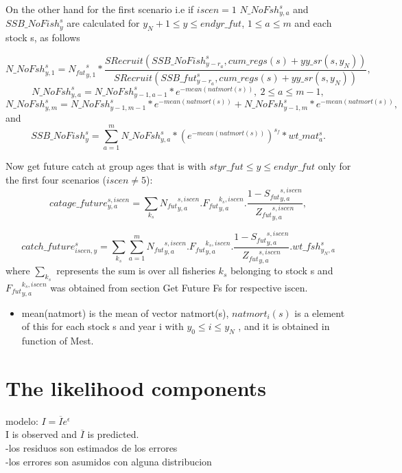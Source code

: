 \documentclass{article}
\begin{document}
On the other hand for the first scenario i.e if $iscen=1$ $N\_NoFsh^s_{y,a}$ and $SSB\_NoFish^s_y$ are calculated for $y_N+1\leq y \leq endyr\_fut$, $1\leq a \leq m$ and each stock s, as follows

\begin{equation}
    N\_NoFsh^{s}_{y,1}={N_{fut}}^s_{y,1}*\dfrac{SRecruit(SSB\_NoFish^s_{y-r_a},cum\_regs(s)+yy\_sr(s,y_N))}{ SRecruit(SSB\_fut^s_{y-r_a},cum\_regs(s)+yy\_sr(s,y_N))},
\end{equation}
\begin{equation}
    N\_NoFsh^{s}_{y,a}=N\_NoFsh^s_{y-1,a-1}*e^{-mean(natmort(s))}, \ 2\leq a\leq m-1,
\end{equation}
\begin{equation}
    N\_NoFsh^s_{y,m}=N\_NoFsh^s_{y-1,m-1}*e^{-mean(natmort(s))}+N\_NoFsh^s_{y-1,m}*e^{-mean(natmort(s))},
\end{equation}
and
\begin{equation}
    SSB\_NoFish^s_y   = \sum_{a=1}^mN\_NoFsh^s_{y,a}*(e^{-mean(natmort(s))})^{s_f} * wt\_{mat}^s_a.
\end{equation}

Now get future catch at group ages that is with $styr\_fut \leq y \leq endyr\_fut$ only for the first four scenarios ($iscen\neq 5$):
\begin{equation}
    catage\_future^{s,iscen}_{y,a}=\sum_{k_s} {N_{fut}}^{s,iscen}_{y,a}.{F_{fut}}^{k_s, iscen}_{y,a}.\dfrac{1-{S_{fut}}^{s,iscen}_{y,a}}{{Z_{fut}}^{s,iscen}_{y,a}},
\end{equation}

\begin{equation}
    catch\_future^s_{iscen,y}=\sum_{k_s} \sum_{a=1}^m{N_{fut}}^{s,iscen}_{y,a}.{F_{fut}}^{k_s, iscen}_{y,a}.\dfrac{1-{S_{fut}}^{s,iscen}_{y,a}}{{Z_{fut}}^{s,iscen}_{y,a}}.wt\_fsh^s_{y_N,a}
\end{equation}
where $\displaystyle\sum_{k_s}$ represents the sum is over all fisheries $k_s$ belonging to stock s and ${F_{fut}}^{k_s, iscen}_{y,a}$ was obtained from section Get Future Fs for respective iscen.
\begin{itemize}
    \item mean(natmort) is the mean of vector natmort(s), $natmort_i(s) $ is a element of this for each stock s and year i with $y_0\leq i \leq y_N$ , and it is obtained in function of  Mest. 
\end{itemize}
\section{The likelihood components}
modelo:
$I = \overline{I}e^{\epsilon}$\\
I is observed and $\overline{I}$ is predicted.\\
-los residuos son estimados de los errores\\
-los errores son asumidos con alguna distribucion
\end{document}

